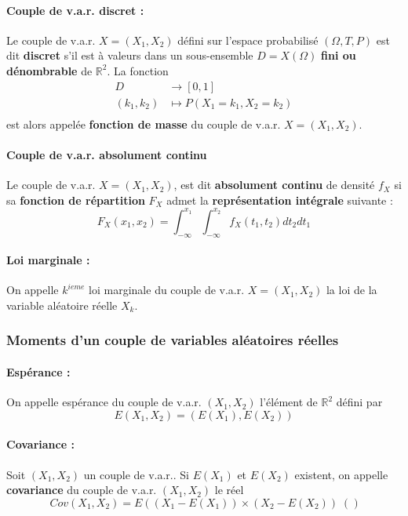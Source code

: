\documentclass[10pt,a4paper,twoside]{article}
\begin{document}
\paragraph{Couple de v.a.r. discret :} Le couple de v.a.r. $X=(X_{1},X_{2})$ défini sur l'espace probabilisé $(\Omega,T,P)$ est dit \textbf{discret} s'il est à valeurs dans un sous-ensemble $D=X(\Omega)$ \textbf{fini ou dénombrable} de $\mathbb{R}^{2}$. La fonction
\begin{align*}
D & \longrightarrow [0,1]\\
(k_{1},k_{2}) & \longmapsto P(X_{1}=k_{1},X_{2}=k_{2})\\
\end{align*}
est alors appelée \textbf{fonction de masse} du couple de v.a.r. $X=(X_{1},X_{2})$.

\paragraph{Couple de v.a.r. absolument continu} Le couple de v.a.r. $X=(X_{1},X_{2})$, est dit \textbf{absolument continu} de densité $f_{X}$ si sa \textbf{fonction de répartition} $F_{X}$ admet la \textbf{représentation intégrale} suivante :
$$F_{X}(x_{1},x_{2}) = \int_{-\infty}^{x_{1}}\int_{-\infty}^{x_{2}}f_{X}(t_{1},t_{2}) dt_{2} dt_{1}$$

\paragraph{Loi marginale :} On appelle $k^{ieme}$ loi marginale du couple de v.a.r. $X=(X_{1},X_{2})$ la loi de la variable aléatoire réelle $X_{k}$.


\subsubsection{Moments d'un couple de variables aléatoires réelles}
\paragraph{Espérance :} On appelle espérance du couple de v.a.r. $(X_{1},X_{2})$ l'élément de $\mathbb{R}^{2}$ défini par
$$E(X_{1},X_{2})=(E(X_{1}),E(X_{2}))$$

\paragraph{Covariance :} Soit $(X_{1},X_{2})$ un couple de v.a.r.. Si $E(X_{1})$ et $E(X_{2})$ existent, on appelle \textbf{covariance} du couple de v.a.r. $(X_{1},X_{2})$ le réel
$$Cov(X_{1},X_{2}) = E\left(\left(X_{1}-E\left(X_{1}\right)\right)\times\left(X_{2}-E\left(X_{2}\right)\right)\right()$$
\end{document}
